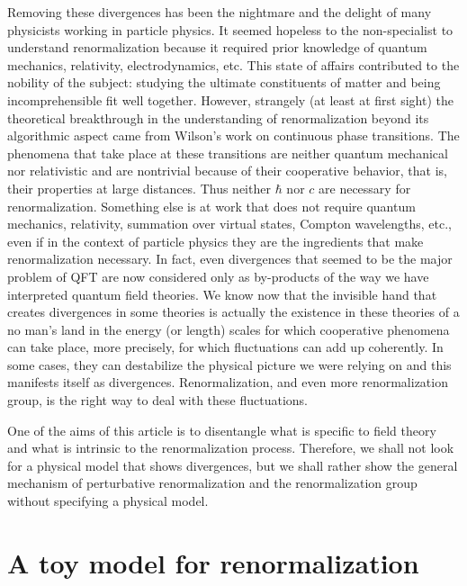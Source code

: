 \documentclass[floatfix,twocolumn,preprintnumbers,amsmath,amssymb,prb]{revtex4}
\begin{document}
Removing these divergences has been the nightmare and the delight
of many physicists working in particle physics. It seemed hopeless
to the non-specialist to understand renormalization because it
required prior knowledge of quantum mechanics, relativity,
electrodynamics, etc. This state of affairs contributed to the
nobility of the subject: studying the ultimate constituents
of matter and being incomprehensible fit well together. However,
strangely (at least at first sight) the theoretical breakthrough
in the understanding of renormalization beyond its algorithmic
aspect came from Wilson's work on continuous phase
transitions.\cite{wilson74} The phenomena that take
place at these transitions are neither quantum
mechanical\cite{foot1} nor relativistic and are nontrivial because
of their cooperative behavior, that is, their properties at large
distances.\cite{foot2} Thus neither
$\hbar$ nor $c$ are necessary for renormalization. Something
else is at work that does not require quantum mechanics,
relativity, summation over virtual states, Compton wavelengths,
etc., even if in the context of particle physics they are the
ingredients that make renormalization necessary. In fact, even
divergences that seemed to be the major problem of QFT are now
considered only as by-products of the way we have interpreted
quantum field theories. We know now that the invisible hand that
creates divergences in some theories is actually the existence in
these theories of a no man's land in the energy (or length) scales
for which cooperative phenomena can take place, more precisely,
for which fluctuations can add
up coherently.\cite{lepage89} In some cases,
they can destabilize the physical picture we were relying on and
this manifests itself as divergences. Renormalization, and even
more renormalization group, is the right way to deal with these
fluctuations.

One of the aims of this article is to disentangle what is specific
to field theory and what is intrinsic to the renormalization
process. Therefore, we shall not look for a physical model that 
shows
divergences,\cite{kraus92,mitra98,gosdzinsky91,mead91,adhikari97}
but we shall rather show the general mechanism of perturbative
renormalization and the renormalization group without specifying
a physical model.

\section{A toy model for renormalization}
\end{document}
